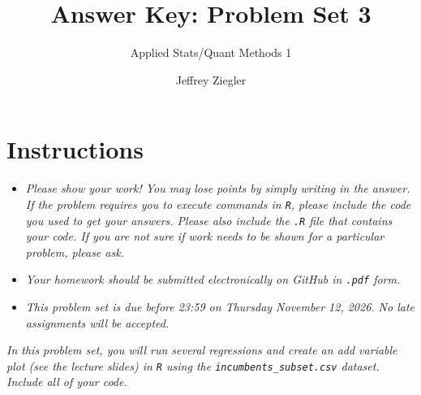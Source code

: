 \documentclass[12pt,letterpaper]{article}
\title{Answer Key: Problem Set 3}
\date{Jeffrey Ziegler}
\author{Applied Stats/Quant Methods 1}
\begin{document}
	\maketitle
	
	\section*{Instructions}
	\begin{itemize}
		\item \textit{Please show your work! You may lose points by simply writing in the answer. If the problem requires you to execute commands in \texttt{R}, please include the code you used to get your answers. Please also include the \texttt{.R} file that contains your code. If you are not sure if work needs to be shown for a particular problem, please ask.}
		\item \textit{Your homework should be submitted electronically on GitHub in \texttt{.pdf} form.}
		\item \textit{This problem set is due before 23:59 on Thursday November 12, 2026. No late assignments will be accepted.}

	\end{itemize}
	\vspace{.25cm}
	
	\noindent \emph{In this problem set, you will run several regressions and create an add variable plot (see the lecture slides) in \texttt{R} using the \texttt{incumbents\_subset.csv} dataset. Include all of your code.}
	
	\vspace{.5cm}
\end{document}
